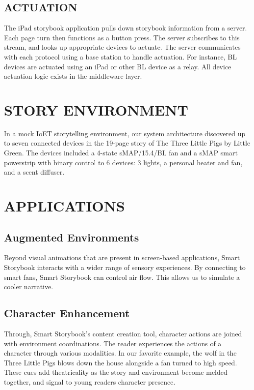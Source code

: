 \documentclass{sigchi}
\begin{document}
\subsection{ACTUATION}
The iPad storybook application pulls down storybook information from a server. Each page turn then functions as a button press. The server subscribes to this stream, and looks up appropriate devices to actuate. 
The server communicates with each protocol using a base station to handle actuation. For instance, BL devices are actuated using an iPad or other BL device as a relay. All device actuation logic exists in the middleware layer. 


\section{STORY ENVIRONMENT}
In a mock IoET storytelling environment, our system architecture discovered up to seven connected devices in the 19-page story of The Three Little Pigs by Little Green. The devices included a 4-state sMAP/15.4/BL fan and a sMAP smart powerstrip with binary control to 6 devices: 3 lights, a personal heater and fan, and a scent diffuser.  



\section{APPLICATIONS}
\subsection{Augmented Environments}
Beyond visual animations that are present in screen-based applications, Smart Storybook interacts with a wider range of sensory experiences. By connecting to smart fans, Smart Storybook can control air flow. This allows us to simulate a cooler narrative.
\subsection{Character Enhancement}
Through, Smart Storybook's content creation tool, character actions are joined with environment coordinations. The reader experiences the actions of a character through various modalities. In our favorite example, the wolf in the Three Little Pigs blows down the house alongside a fan turned to high speed. These cues add theatricality as the story and environment become melded together, and signal to young readers character presence. 
\end{document}
